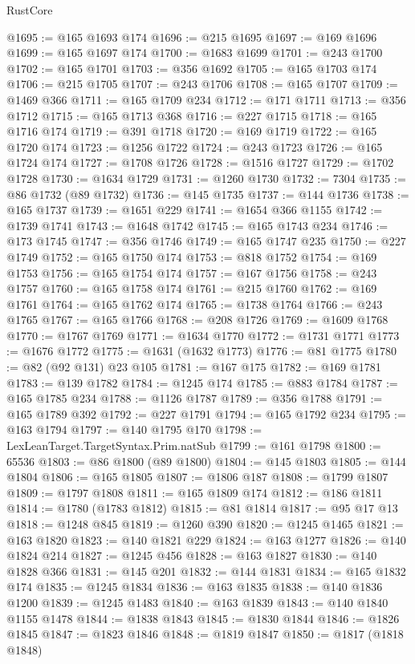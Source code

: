 \begin{lexlean}{RustCore}
\begin{coremodule}
@1695 := @165 @1693 @174
@1696 := @215 @1695
@1697 := @169 @1696
@1699 := @165 @1697 @174
@1700 := @1683 @1699
@1701 := @243 @1700
@1702 := @165 @1701
@1703 := @356 @1692
@1705 := @165 @1703 @174
@1706 := @215 @1705
@1707 := @243 @1706
@1708 := @165 @1707
@1709 := @1469 @366
@1711 := @165 @1709 @234
@1712 := @171 @1711
@1713 := @356 @1712
@1715 := @165 @1713 @368
@1716 := @227 @1715
@1718 := @165 @1716 @174
@1719 := @391 @1718
@1720 := @169 @1719
@1722 := @165 @1720 @174
@1723 := @1256 @1722
@1724 := @243 @1723
@1726 := @165 @1724 @174
@1727 := @1708 @1726
@1728 := @1516 @1727
@1729 := @1702 @1728
@1730 := @1634 @1729
@1731 := @1260 @1730
@1732 := 7304
@1735 := @86 @1732 (@89 @1732)
@1736 := @145 @1735
@1737 := @144 @1736
@1738 := @165 @1737
@1739 := @1651 @229
@1741 := @1654 @366 @1155
@1742 := @1739 @1741
@1743 := @1648 @1742
@1745 := @165 @1743 @234
@1746 := @173 @1745
@1747 := @356 @1746
@1749 := @165 @1747 @235
@1750 := @227 @1749
@1752 := @165 @1750 @174
@1753 := @818 @1752
@1754 := @169 @1753
@1756 := @165 @1754 @174
@1757 := @167 @1756
@1758 := @243 @1757
@1760 := @165 @1758 @174
@1761 := @215 @1760
@1762 := @169 @1761
@1764 := @165 @1762 @174
@1765 := @1738 @1764
@1766 := @243 @1765
@1767 := @165 @1766
@1768 := @208 @1726
@1769 := @1609 @1768
@1770 := @1767 @1769
@1771 := @1634 @1770
@1772 := @1731 @1771
@1773 := @1676 @1772
@1775 := @1631 (@1632 @1773)
@1776 := @81 @1775
@1780 := @82 (@92 @131) @23 @105
@1781 := @167 @175
@1782 := @169 @1781
@1783 := @139 @1782
@1784 := @1245 @174
@1785 := @883 @1784
@1787 := @165 @1785 @234
@1788 := @1126 @1787
@1789 := @356 @1788
@1791 := @165 @1789 @392
@1792 := @227 @1791
@1794 := @165 @1792 @234
@1795 := @163 @1794
@1797 := @140 @1795 @170
@1798 := LexLeanTarget.TargetSyntax.Prim.natSub
@1799 := @161 @1798
@1800 := 65536
@1803 := @86 @1800 (@89 @1800)
@1804 := @145 @1803
@1805 := @144 @1804
@1806 := @165 @1805
@1807 := @1806 @187
@1808 := @1799 @1807
@1809 := @1797 @1808
@1811 := @165 @1809 @174
@1812 := @186 @1811
@1814 := @1780 (@1783 @1812)
@1815 := @81 @1814
@1817 := @95 @17 @13
@1818 := @1248 @845
@1819 := @1260 @390
@1820 := @1245 @1465
@1821 := @163 @1820
@1823 := @140 @1821 @229
@1824 := @163 @1277
@1826 := @140 @1824 @214
@1827 := @1245 @456
@1828 := @163 @1827
@1830 := @140 @1828 @366
@1831 := @145 @201
@1832 := @144 @1831
@1834 := @165 @1832 @174
@1835 := @1245 @1834
@1836 := @163 @1835
@1838 := @140 @1836 @1200
@1839 := @1245 @1483
@1840 := @163 @1839
@1843 := @140 @1840 @1155 @1478
@1844 := @1838 @1843
@1845 := @1830 @1844
@1846 := @1826 @1845
@1847 := @1823 @1846
@1848 := @1819 @1847
@1850 := @1817 (@1818 @1848)

\end{coremodule}
\end{lexlean}
